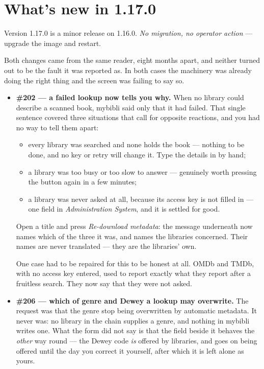 \section{What's new in 1.17.0}\label{sec:whats-new-1.17.0}

Version 1.17.0 is a minor release on 1.16.0. \emph{No migration, no
operator action} \string— upgrade the image and restart.

Both changes came from the same reader, eight months apart, and neither
turned out to be the fault it was reported as. In both cases the
machinery was already doing the right thing and the screen was failing
to say so.

\begin{itemize}
  \item \textbf{\#202 \string— a failed lookup now tells you why.} When
        no library could describe a scanned book, mybibli said only that
        it had failed. That single sentence covered three situations
        that call for opposite reactions, and you had no way to tell
        them apart:

        \begin{itemize}
          \item every library was searched and none holds the book
                \string— nothing to be done, and no key or retry will
                change it. Type the details in by hand;
          \item a library was too busy or too slow to answer \string—
                genuinely worth pressing the button again in a few
                minutes;
          \item a library was never asked at all, because its access key
                is not filled in \string— one field in
                \emph{Administration \textrightarrow{} System}, and it
                is settled for good.
        \end{itemize}

        Open a title and press \emph{Re-download metadata}: the message
        underneath now names which of the three it was, and names the
        libraries concerned. Their names are never translated \string—
        they are the libraries' own.

        One case had to be repaired for this to be honest at all. OMDb
        and TMDb, with no access key entered, used to report exactly
        what they report after a fruitless search. They now say that
        they were not asked.
  \item \textbf{\#206 \string— which of genre and Dewey a lookup may
        overwrite.} The request was that the genre stop being
        overwritten by automatic metadata. It never was: no library in
        the chain supplies a genre, and nothing in mybibli writes one.
        What the form did not say is that the field beside it behaves
        the \emph{other} way round \string— the Dewey code \emph{is}
        offered by libraries, and goes on being offered until the day
        you correct it yourself, after which it is left alone as yours.


\end{itemize}
